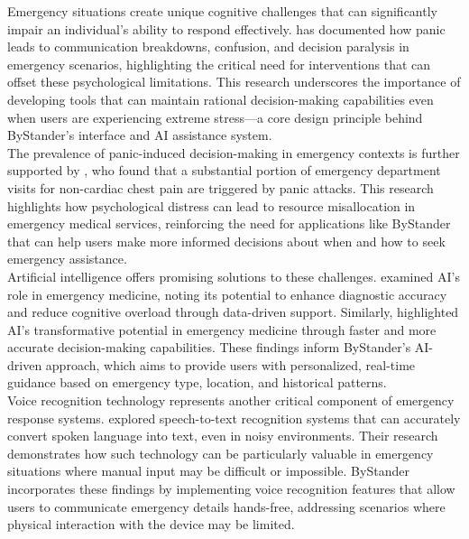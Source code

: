 Emergency situations create unique cognitive challenges that can significantly impair an individual's ability to respond effectively. \cite{aguirre2005emergency} has documented how panic leads to communication breakdowns, confusion, 
and decision paralysis in emergency scenarios, highlighting the critical need for interventions that can offset these psychological limitations. 
This research underscores the importance of developing tools that can maintain rational decision-making capabilities even when users are experiencing extreme stress—a core design principle 
behind ByStander's interface and AI assistance system. \\

The prevalence of panic-induced decision-making in emergency contexts is further supported 
by \cite{foldesbusque2017closer}, who found that a substantial portion of emergency department 
visits for non-cardiac chest pain are triggered by panic attacks. This research highlights how psychological 
distress can lead to resource misallocation in emergency medical services, reinforcing the need for applications like ByStander that can help users make more informed decisions about when and how to seek emergency assistance. \\ 

Artificial intelligence offers promising solutions to these challenges. \cite{kirubarajan2020artificial} examined AI's role 
in emergency medicine, noting its potential to enhance diagnostic accuracy and reduce cognitive overload through data-driven support. 
Similarly, \cite{kiran2020artificial} highlighted AI's transformative potential in emergency medicine through faster and more accurate 
decision-making capabilities. These findings inform ByStander's AI-driven approach, which aims to provide users with personalized, 
real-time guidance based on emergency type, location, and historical patterns. \\ 

Voice recognition technology represents another critical component of emergency response systems. \cite{voice_recognition} 
explored speech-to-text recognition systems that can accurately convert spoken language into text, even in noisy environments. 
Their research demonstrates how such technology can be particularly valuable in emergency situations where manual input may be difficult 
or impossible. ByStander incorporates these findings by implementing voice recognition features that allow users to communicate emergency 
details hands-free, addressing scenarios where physical interaction with the device may be limited. \\

